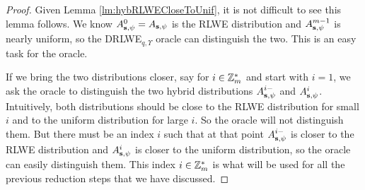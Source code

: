 \documentclass[../main.tex]{subfiles}
\begin{document}
\begin{proof}
Given Lemma \ref{lm:hybRLWECloseToUnif}, it is not difficult to see this lemma follows. We know $A_{\mathbf{s},\psi}^{0}=A_{\mathbf{s},\psi}$ is the RLWE distribution and $A_{\mathbf{s},\psi}^{m-1}$ is nearly uniform, so the DRLWE$_{q,\Upsilon}$ oracle can distinguish the two. This is an easy task for the oracle. 

If we bring the two distributions closer, say for $i \in \mathbb{Z}_m^*$ and start with $i=1$, we ask the oracle to distinguish the two hybrid distributions $A_{\mathbf{s},\psi}^{i-}$ and $A_{\mathbf{s},\psi}^{i}$.
Intuitively, both distributions should be close to the RLWE distribution for small $i$ and to the uniform distribution for large $i$. So the oracle will not distinguish them. But there must be an index $i$ such that at that point $A_{\mathbf{s},\psi}^{i-}$ is closer to the RLWE distribution and $A_{\mathbf{s},\psi}^{i}$ is closer to the uniform distribution, so the oracle can easily distinguish them. This index $i \in \mathbb{Z}_m^*$ is what will be used for all the previous reduction steps that we have discussed.  
\end{proof}










%
%
\end{document}
